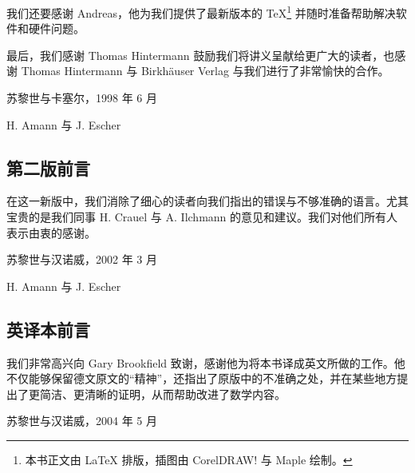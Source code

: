 我们还要感谢 Andreas，他为我们提供了最新版本的  \TeX{}\footnote{本书正文由 \LaTeX{} 排版，插图由 CorelDRAW! 与 Maple 绘制。} 并随时准备帮助解决软件和硬件问题。

最后，我们感谢 Thomas Hintermann 鼓励我们将讲义呈献给更广大的读者，也感谢 Thomas Hintermann 与 Birkhäuser Verlag 与我们进行了非常愉快的合作。

苏黎世与卡塞尔，1998 年 6 月

H. Amann 与 J. Escher

\subsection*{第二版前言}

在这一新版中，我们消除了细心的读者向我们指出的错误与不够准确的语言。尤其宝贵的是我们同事 H. Crauel 与 A. Ilchmann 的意见和建议。我们对他们所有人表示由衷的感谢。

苏黎世与汉诺威，2002 年 3 月

H. Amann 与 J. Escher

\subsection*{英译本前言}

我们非常高兴向 Gary Brookfield 致谢，感谢他为将本书译成英文所做的工作。他不仅能够保留德文原文的“精神”，还指出了原版中的不准确之处，并在某些地方提出了更简洁、更清晰的证明，从而帮助改进了数学内容。

苏黎世与汉诺威，2004 年 5 月
